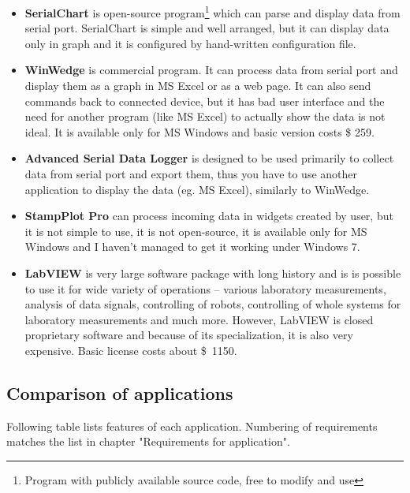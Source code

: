 \documentclass[12pt, a4paper, oneside]{article}
\begin{document}
\begin{itemize}
    \item {\bf SerialChart}\cite{serialchart} is open-source program\footnote{Program with publicly available source code, free to modify and use} which can parse and display data from serial port. SerialChart is simple and well arranged, but it can display data only in graph and it is configured by hand-written configuration file.
    \item {\bf WinWedge}\cite{winwedge} is commercial program. It can process data from serial port and display them as a graph in MS Excel or as a web page. It can also send commands back to connected device, but it has bad user interface and the need for another program (like MS Excel) to actually show the data is not ideal. It is available only for MS Windows and basic version costs \$ 259.
    \item {\bf Advanced Serial Data Logger}\cite{serialdatalogger} is designed to be used primarily to collect data from serial port and export them, thus you have to use another application to display the data (eg. MS Excel), similarly to WinWedge.
    \item {\bf StampPlot Pro}\cite{stamplot} can process incoming data in widgets created by user, but it is not simple to use, it is not open-source, it is available only for MS Windows and I haven't managed to get it working under Windows 7.
    \item {\bf LabVIEW}\cite{labview} is very large software package with long history and is is possible to use it for wide variety of operations -- various laboratory measurements, analysis of data signals, controlling of robots, controlling of whole systems for laboratory measurements and much more. However, LabVIEW is closed proprietary software and because of its specialization, it is also very expensive. Basic license costs about \$~1150.
\end{itemize}

\subsection{Comparison of applications}
Following table lists features of each application. Numbering of requirements matches the list in chapter "Requirements for application".

\vspace{5mm}
\end{document}
